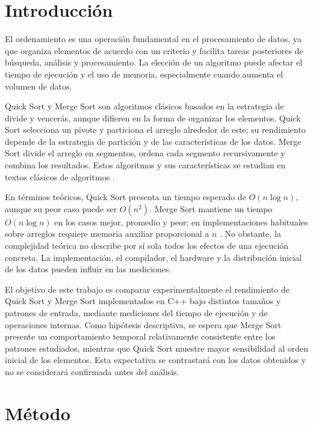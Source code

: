 \vspace{0.35cm}
\twocolumn


\section{Introducción}

El ordenamiento es una operación fundamental en el procesamiento de datos, ya que organiza elementos de acuerdo con un criterio y facilita tareas posteriores de búsqueda, análisis y procesamiento. La elección de un algoritmo puede afectar el tiempo de ejecución y el uso de memoria, especialmente cuando aumenta el volumen de datos.

Quick Sort y Merge Sort son algoritmos clásicos basados en la estrategia de divide y vencerás, aunque difieren en la forma de organizar los elementos. Quick Sort selecciona un pivote y particiona el arreglo alrededor de este; su rendimiento depende de la estrategia de partición y de las características de los datos. Merge Sort divide el arreglo en segmentos, ordena cada segmento recursivamente y combina los resultados. Estos algoritmos y sus características se estudian en textos clásicos de algoritmos \parencite{cormen2022,sedgewick2011}.

En términos teóricos, Quick Sort presenta un tiempo esperado de \(O(n\log n)\), aunque su peor caso puede ser \(O(n^2)\). Merge Sort mantiene un tiempo \(O(n\log n)\) en los casos mejor, promedio y peor; en implementaciones habituales sobre arreglos requiere memoria auxiliar proporcional a \(n\) \parencite{cormen2022}. No obstante, la complejidad teórica no describe por sí sola todos los efectos de una ejecución concreta. La implementación, el compilador, el hardware y la distribución inicial de los datos pueden influir en las mediciones.

El objetivo de este trabajo es comparar experimentalmente el rendimiento de Quick Sort y Merge Sort implementados en C++ bajo distintos tamaños y patrones de entrada, mediante mediciones del tiempo de ejecución y de operaciones internas. Como hipótesis descriptiva, se espera que Merge Sort presente un comportamiento temporal relativamente consistente entre los patrones estudiados, mientras que Quick Sort muestre mayor sensibilidad al orden inicial de los elementos. Esta expectativa se contrastará con los datos obtenidos y no se considerará confirmada antes del análisis.


\section{Método}

